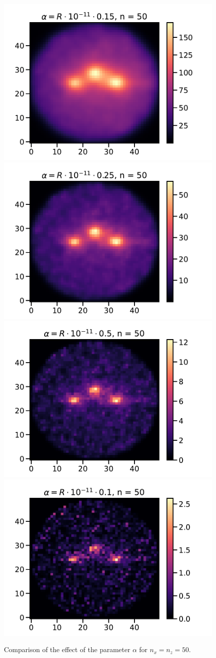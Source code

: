 \documentclass[a4paper,12pt]{article}
\begin{document}
\begin{figure}[H]
    \includegraphics[width=.6\textwidth]{../img-mpi/graph50-0.pdf}\hfill
    \includegraphics[width=.6\textwidth]{../img-mpi/graph50-1.pdf}\hfill
    \\[\smallskipamount]
    \includegraphics[width=.6\textwidth]{../img-mpi/graph50-2.pdf}\hfill
    \includegraphics[width=.6\textwidth]{../img-mpi/graph50-3.pdf}
    \caption{Comparison of the effect of the parameter \(\alpha\)
    for \(n_x = n_z = 50\).}
\end{figure}
\end{document}
